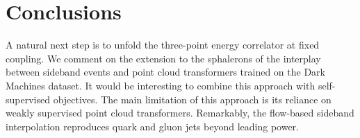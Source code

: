 \section{Conclusions}\label{sec:conclusions}

A natural next step is to unfold the three-point energy correlator at
fixed coupling. We comment on the extension to the sphalerons of the
interplay between sideband events and point cloud transformers trained
on the Dark Machines dataset. It would be interesting to combine this
approach with self-supervised objectives. The main limitation of this
approach is its reliance on weakly supervised point cloud transformers.
Remarkably, the flow-based sideband interpolation reproduces quark and
gluon jets beyond leading power.

